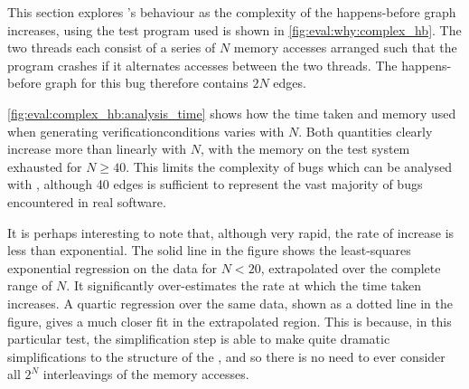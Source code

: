 \noindent
This section explores {\technique}'s behaviour as the complexity of
the happens-before graph increases, using the test program used is
shown in \autoref{fig:eval:why:complex_hb}.  The two threads each
consist of a series of $N$ memory accesses arranged such that the
program crashes if it alternates accesses between the two threads.
The happens-before graph for this bug therefore contains $2N$ edges.


\autoref{fig:eval:complex_hb:analysis_time} shows how the time taken
and memory used when generating \glspl{verificationcondition} varies
with $N$.  Both quantities clearly increase more than linearly with
$N$, with the memory on the test system exhausted for $N \geq 40$.
This limits the complexity of bugs which can be analysed with
{\technique}, although 40 edges is sufficient to represent the vast
majority of bugs encountered in real software\needCite{}.

 It is perhaps interesting to
note that, although very rapid, the rate of increase is less than
exponential.  The solid line in the figure shows the least-squares
exponential regression on the data for $N<20$, extrapolated over the
complete range of $N$.  It significantly over-estimates the rate at
which the time taken increases.  A quartic regression over the same
data, shown as a dotted line in the figure, gives a much closer fit in
the extrapolated region.  This is because, in this particular test,
the {\StateMachine} simplification step is able to make quite dramatic
simplifications to the structure of the {\StateMachines}, and so there
is no need to ever consider all $2^N$ interleavings of the memory
accesses.

